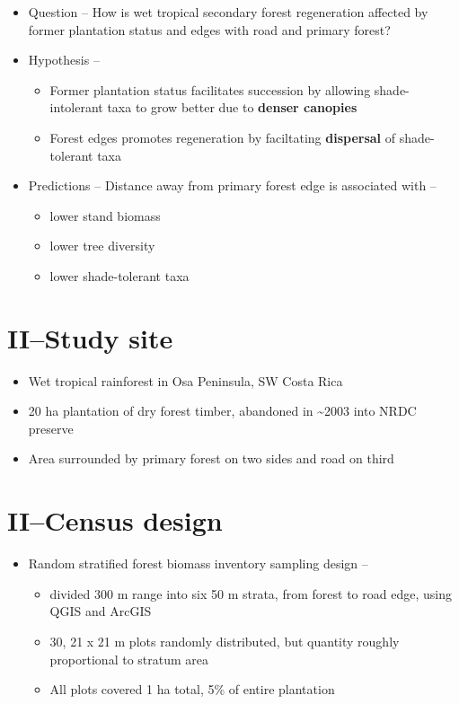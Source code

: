 \documentclass[
]{article}
\begin{document}
\begin{itemize}
\item
  Question -- How is wet tropical secondary forest regeneration affected
  by former plantation status and edges with road and primary forest?
\item
  Hypothesis --

  \begin{itemize}
  \item
    Former plantation status facilitates succession by allowing
    shade-intolerant taxa to grow better due to \textbf{denser canopies}
  \item
    Forest edges promotes regeneration by faciltating \textbf{dispersal}
    of shade-tolerant taxa
  \end{itemize}
\item
  Predictions -- Distance away from primary forest edge is associated
  with --

  \begin{itemize}
  \item
    lower stand biomass
  \item
    lower tree diversity
  \item
    lower shade-tolerant taxa
  \end{itemize}
\end{itemize}

\hypertarget{iistudy-site}{%
\section{II--Study site}\label{iistudy-site}}

\begin{itemize}
\item
  Wet tropical rainforest in Osa Peninsula, SW Costa Rica
\item
  20 ha plantation of dry forest timber, abandoned in
  \textasciitilde2003 into NRDC preserve
\item
  Area surrounded by primary forest on two sides and road on third
\end{itemize}

\hypertarget{iicensus-design}{%
\section{II--Census design}\label{iicensus-design}}

\begin{itemize}
\item
  Random stratified forest biomass inventory sampling design --

  \begin{itemize}
  \item
    divided 300 m range into six 50 m strata, from forest to road edge,
    using QGIS and ArcGIS
  \item
    30, 21 x 21 m plots randomly distributed, but quantity roughly
    proportional to stratum area
  \item
    All plots covered 1 ha total, 5\% of entire plantation
  \end{itemize}
\end{itemize}
\end{document}
